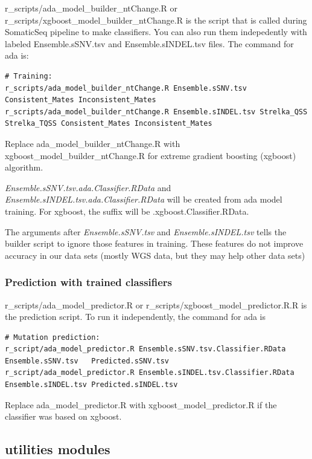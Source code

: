 \documentclass[10pt,letterpaper]{article}
\begin{document}
\begin{sloppypar}
r\_scripts/ada\_model\_builder\_ntChange.R or r\_scripts/xgboost\_model\_builder\_ntChange.R is the script that is called during SomaticSeq pipeline to make classifiers. You can also run them indepedently with labeled Ensemble.sSNV.tsv and Ensemble.sINDEL.tsv files. The command for ada is:

\begin{lstlisting}
# Training:
r_scripts/ada_model_builder_ntChange.R Ensemble.sSNV.tsv   Consistent_Mates Inconsistent_Mates
r_scripts/ada_model_builder_ntChange.R Ensemble.sINDEL.tsv Strelka_QSS Strelka_TQSS Consistent_Mates Inconsistent_Mates
\end{lstlisting}

Replace ada\_model\_builder\_ntChange.R with xgboost\_model\_builder\_ntChange.R for extreme gradient boosting (xgboost) algorithm. 

\textit{Ensemble.sSNV.tsv.ada.Classifier.RData} and \textit{Ensemble.sINDEL.tsv.ada.Classifier.RData} will be created from ada model training. For xgboost, the suffix will be .xgboost.Classifier.RData. 

The arguments after \textit{Ensemble.sSNV.tsv} and \textit{Ensemble.sINDEL.tsv} tells the builder script to ignore those features in training. These features do not improve accuracy in our data sets (mostly WGS data, but they may help other data sets)


\subsubsection{Prediction with trained classifiers} \label{module:r_predict}

r\_scripts/ada\_model\_predictor.R or r\_scripts/xgboost\_model\_predictor.R.R is the prediction script. To run it independently, the command for ada is
      
\begin{lstlisting}
# Mutation prediction:
r_script/ada_model_predictor.R Ensemble.sSNV.tsv.Classifier.RData   Ensemble.sSNV.tsv   Predicted.sSNV.tsv
r_script/ada_model_predictor.R Ensemble.sINDEL.tsv.Classifier.RData Ensemble.sINDEL.tsv Predicted.sINDEL.tsv
\end{lstlisting}

Replace ada\_model\_predictor.R with xgboost\_model\_predictor.R if the classifier was based on xgboost. 




\subsection{utilities modules} \label{module:utilities}


\end{sloppypar}
\end{document}
